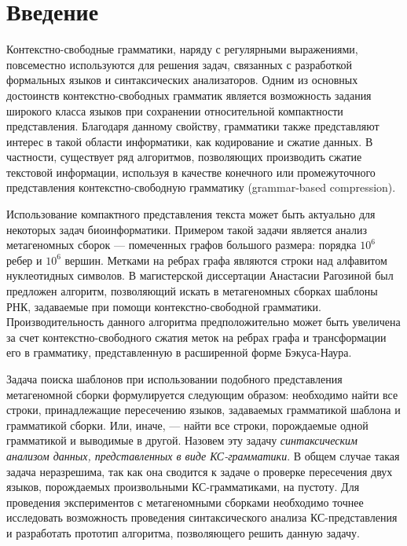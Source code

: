 \section*{Введение}

Контекстно-свободные грамматики, наряду с регулярными выражениями, повсеместно используются для решения задач, связанных с разработкой формальных языков и синтаксических анализаторов. 
Одним из основных достоинств контекстно-свободных грамматик является возможность задания широкого класса языков при сохранении относительной компактности представления. 
Благодаря данному свойству, грамматики также представляют интерес в такой области информатики, как кодирование и сжатие данных. 
В частности, существует ряд алгоритмов, позволяющих производить сжатие текстовой информации, используя в качестве конечного \cite{Sequitur} или промежуточного \cite{Arimura} представления контекстно-свободную грамматику (grammar-based compression).

Использование компактного представления текста может быть актуально для некоторых задач биоинформатики. 
Примером такой задачи является анализ метагеномных сборок --- помеченных графов большого размера: порядка $10^6$ ребер и $10^6$ вершин. 
Метками на ребрах графа являются строки над алфавитом нуклеотидных символов. 
В магистерской диссертации Анастасии Рагозиной \cite{Nastya} был предложен алгоритм, позволяющий искать в метагеномных сборках шаблоны РНК, задаваемые при помощи контекстно-свободной грамматики.
Производительность данного алгоритма предположительно может быть увеличена за счет контекстно-свободного сжатия меток на ребрах графа и трансформации его в грамматику, представленную в расширенной форме Бэкуса-Наура.

Задача поиска шаблонов при использовании подобного представления метагеномной сборки формулируется следующим образом: необходимо найти все строки, принадлежащие пересечению языков, задаваемых грамматикой шаблона и грамматикой сборки. Или, иначе, --- найти все строки, порождаемые одной грамматикой и выводимые в другой. Назовем эту задачу \textit{синтаксическим анализом данных, представленных в виде КС-грамматики}.
В общем случае такая задача неразрешима, так как она сводится к задаче о проверке пересечения двух языков, порождаемых произвольными КС-грамматиками, на пустоту. Для проведения экспериментов с метагеномными сборками необходимо точнее исследовать возможность проведения синтаксического анализа КС-представления и разработать прототип алгоритма, позволяющего решить данную задачу.